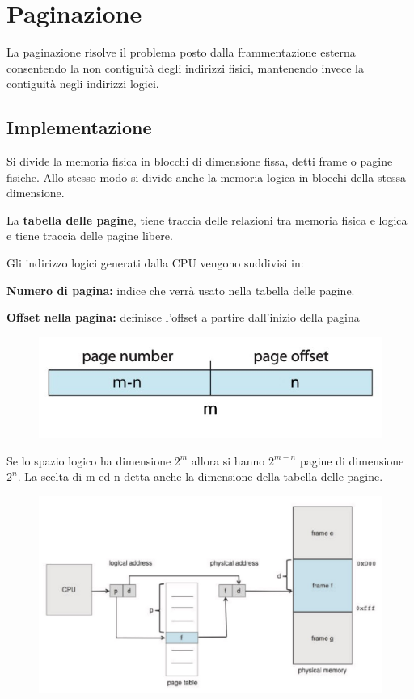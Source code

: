 \section{Paginazione}
La paginazione risolve il problema posto dalla frammentazione esterna consentendo la non contiguità degli indirizzi fisici, mantenendo invece la contiguità negli indirizzi logici.

\subsection{Implementazione}
Si divide la memoria fisica in blocchi di dimensione fissa, detti frame o pagine fisiche. Allo stesso modo si divide anche la memoria logica in blocchi della stessa dimensione.

La \textbf{tabella delle pagine}, tiene traccia delle relazioni tra memoria fisica e logica e tiene traccia delle pagine libere.

\spacer
Gli indirizzo logici generati dalla CPU vengono suddivisi in:
\begin{sitemize}
    \item \textbf{Numero di pagina:} indice che verrà usato nella tabella delle pagine.
    \item \textbf{Offset nella pagina:} definisce l'offset a partire dall'inizio della pagina
\end{sitemize}

\begin{figure}[H]
    \centering
    \includegraphics[width=0.35\linewidth]{assets/page-number-offset.jpg}
\end{figure}

Se lo spazio logico ha dimensione $2^m$ allora si hanno $2^{m-n}$ pagine di dimensione $2^n$. La scelta di m ed n detta anche la dimensione della tabella delle pagine.

\begin{figure}[H]
    \centering
    \includegraphics[width=0.48\linewidth]{assets/paginazione.jpg}
\end{figure}

